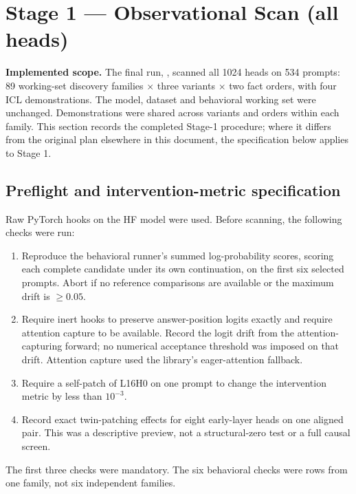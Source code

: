 \section{Stage 1 --- Observational Scan (all heads)}
\textbf{Implemented scope.} The final run, , scanned all 1024 heads on 534 prompts: 89 working-set discovery families $\times$ three variants $\times$ two fact orders, with four ICL demonstrations. The model, dataset and behavioral working set were unchanged. Demonstrations were shared across variants and orders within each family. This section records the completed Stage-1 procedure; where it differs from the original plan elsewhere in this document, the specification below applies to Stage 1.

\subsection{Preflight and intervention-metric specification}
Raw PyTorch hooks on the HF model were used. Before scanning, the following checks were run:
\begin{enumerate}[itemsep=1pt]
\item Reproduce the behavioral runner's summed log-probability scores, scoring each complete candidate under its own continuation, on the first six selected prompts. Abort if no reference comparisons are available or the maximum drift is $\ge 0.05$.
\item Require inert hooks to preserve answer-position logits exactly and require attention capture to be available. Record the logit drift from the attention-capturing forward; no numerical acceptance threshold was imposed on that drift. Attention capture used the library's eager-attention fallback.
\item Require a self-patch of L16H0 on one prompt to change the intervention metric by less than $10^{-3}$.
\item Record exact twin-patching effects for eight early-layer heads on one aligned pair. This was a descriptive preview, not a structural-zero test or a full causal screen.
\end{enumerate}
The first three checks were mandatory. The six behavioral checks were rows from one family, not six independent families.

